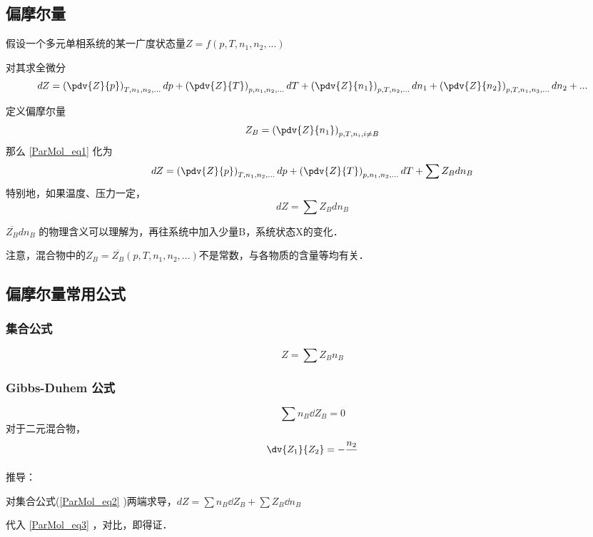 \subsection{偏摩尔量}
假设一个多元单相系统的某一广度状态量$Z=f(p,T,n_1,n_2,...)$

对其求全微分
\begin{equation}\label{ParMol_eq1}
dZ = \left(\pdv{Z}{p}\right)_{T,n_1,n_2,...}dp + \left(\pdv{Z}{T}\right)_{p,n_1,n_2,...}dT+\left(\pdv{Z}{n_1}\right)_{p,T,n_2,...}dn_1+\left(\pdv{Z}{n_2}\right)_{p,T,n_1,n_3,...}dn_2+...
\end{equation}

定义偏摩尔量
\begin{equation}
{Z_B} = \left(\pdv{Z}{n_1}\right)_{p,T,n_i, i \neq B} 
\end{equation}
那么 \autoref{ParMol_eq1} 化为 
\begin{equation}
dZ = \left(\pdv{Z}{p}\right)_{T,n_1,n_2,...}dp + \left(\pdv{Z}{T}\right)_{p,n_1,n_2,...}dT+\sum {Z_B} dn_B
\end{equation}
特别地，如果温度、压力一定，
\begin{equation}\label{ParMol_eq3}
dZ = \sum {Z_B} dn_B
\end{equation}

$\overline {Z_B} d n_B$ 的物理含义可以理解为，再往系统中加入少量B，系统状态X的变化．

注意，混合物中的${Z_B}=\overline {Z_B}(p,T,n_1,n_2,...)$不是常数，与各物质的含量等均有关．

\subsection{偏摩尔量常用公式}
\subsubsection{集合公式}
\begin{equation}\label{ParMol_eq2}
Z=\sum {Z_B}  n_B
\end{equation}
\subsubsection{Gibbs-Duhem 公式}
\begin{equation}
\sum n_B \dd Z_B = 0
\end{equation}
对于二元混合物，
\begin{equation}
\dv{Z_1}{Z_2}=-\frac{n_2}{}
\end{equation}

推导：

对集合公式(\autoref{ParMol_eq2} )两端求导，$dZ=\sum n_B \dd Z_B + \sum {Z_B}  \dd n_B$

代入 \autoref{ParMol_eq3} ，对比，即得证．
